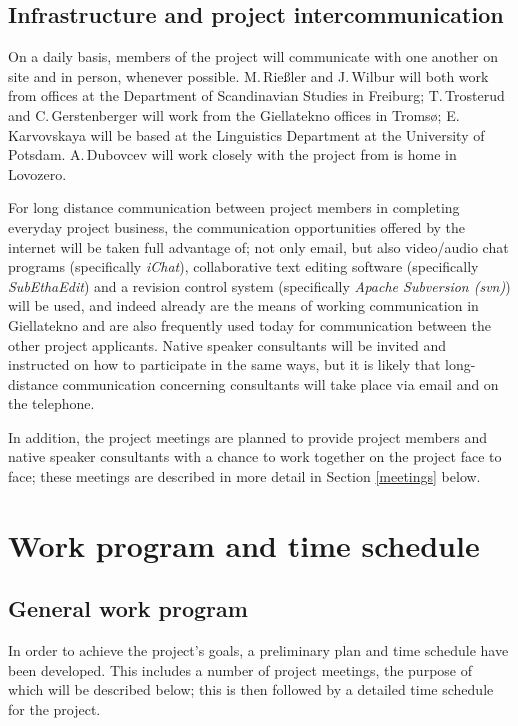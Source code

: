 \documentclass[a4paper,12pt]{article}
\begin{document}
{{{{\subsection{Infrastructure and project intercommunication}
On a daily basis, members of the project will communicate with one another on site and in person, whenever possible. M.\,Rießler and J.\,Wilbur will both work from offices at the Department of Scandinavian Studies in Freiburg; T.\,Trosterud and C.\,Gerstenberger will work from the Giellatekno offices in Tromsø; E.\,Karvovskaya will be based at the Linguistics Department at the University of Potsdam. A.\,Dubovcev will work closely with the project from is home in Lovozero.

For long distance communication between project members in completing everyday project business, the communication opportunities offered by the internet will be taken full advantage of; not only email, but also video/audio chat programs (specifically \textit{iChat}), collaborative text editing software (specifically \textit{SubEthaEdit}) and a revision control system (specifically \textit{Apache Subversion (svn)}) will be used, and indeed already are the means of working communication in Giellatekno and are also frequently used today for communication between the other project applicants. Native speaker consultants will be invited and instructed on how to participate in the same ways, but it is likely that long-distance communication concerning consultants will take place via email and on the telephone.

In addition, the project meetings are planned to provide project members and native speaker consultants with a chance to work together on the project face to face; these meetings are described in more detail in Section \ref{meetings} below.

\section{Work program and time schedule}
\subsection{General work program}

In order to achieve the project's goals, a preliminary plan and time schedule have been developed. This includes a number of project meetings, the purpose of which will be described below; this is then followed by a detailed time schedule for the project.

}}}}
\end{document}
